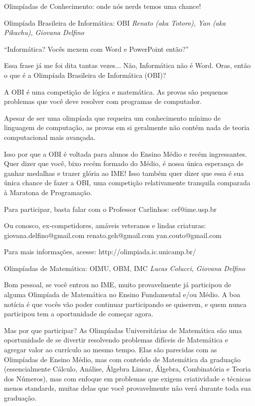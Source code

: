 \begin{secao}{Olimpíadas de Conhecimento: onde nós nerds temos uma chance!}

\begin{subsecao}{Olimpíada Brasileira de Informática: OBI}
{\em Renato (aka Totoro), Yan (aka Pikachu), Giovana Delfino} %

``Informática? Vocês mexem com Word e PowerPoint então?''

Essa frase já me foi dita tantas vezes... Não, Informática não é Word.
Oras, então o que é a Olimpíada Brasileira de Informática (OBI)?

A OBI é uma competição de lógica e matemática. As provas são pequenos
problemas que você deve resolver com programas de computador.

Apesar de ser uma olimpíada que requeira um conhecimento mínimo de 
linguagem de computação, as provas em si geralmente não contém nada 
de teoria computacional mais avançada. 

Isso por que a OBI é voltada para alunos do Ensino Médio e recém
ingressantes. Quer dizer que você, bixo recém formado do Médio,
é nossa única esperança de ganhar medalhas e trazer glória ao IME!
Isso também quer dizer que essa é sua única chance de fazer a OBI,
uma competição relativamente tranquila comparada à Maratona de 
Programação.

Para participar, basta falar com o Professor Carlinhos:
cef@ime.usp.br

Ou conosco, ex-competidores, amáveis veteranos e lindas criaturas:
giovana.delfino@gmail.com
renato.geh@gmail.com
yan.couto@gmail.com

Para mais informações, acesse:
http://olimpiada.ic.unicamp.br/

\end{subsecao}

\begin{subsecao}{Olimpíadas de Matemática: OIMU, OBM, IMC}
{\em Lucas Colucci, Giovana Delfino} %

Bom pessoal, se você entrou no IME, muito provavelmente já participou
de alguma Olimpíada de Matemática no Ensino Fundamental e/ou Médio. A 
boa notícia é que vocês vão poder continuar participando se quiserem,
e quem nunca participou tem a oportunidade de começar agora.

Mas por que participar? As Olimpíadas Universitárias de Matemática são uma
oportunidade de se divertir resolvendo problemas difíceis de Matemática e agregar
valor ao currículo ao mesmo tempo. Elas são parecidas com as Olimpíadas de
Ensino Médio, mas com conteúdo de Matemática da graduação (essencialmente 
Cálculo, Análise, Álgebra Linear, Álgebra, Combinatória e Teoria dos Números), 
mas com enfoque em problemas que exigem criatividade e técnicas menos standards,
muitas delas que você provavelmente não verá durante toda sua graduação.


\end{subsecao}
\end{secao}
